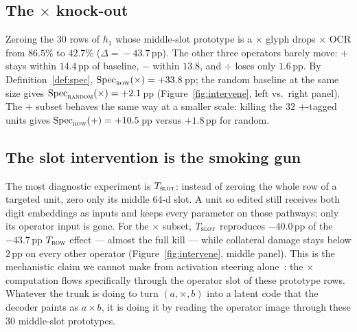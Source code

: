 \documentclass[11pt]{article}
\theoremstyle{papsty}
\newcommand{\Spec}{\mathrm{Spec}}
\begin{document}
\subsection{The $\times$ knock-out}
Zeroing the $30$ rows of $h_1$ whose middle-slot prototype is a
$\times$ glyph drops $\times$ OCR from $86.5\%$ to $42.7\%$
($\Delta\!=\!-43.7$\,pp).
The other three operators barely move:
$+$ stays within $14.4$\,pp of baseline, $-$ within $13.8$, and $\div$
loses only $1.6$\,pp.
By Definition~\ref{def:spec},
$\Spec_{\textsc{row}}(\times) = +33.8$\,pp;
the random baseline at the same size gives
$\Spec_{\textsc{random}}(\times) = +2.1$\,pp
(Figure~\ref{fig:intervene}, left vs.\ right panel).
The $+$ subset behaves the same way at a smaller scale:
killing the $32$ $+$-tagged units gives
$\Spec_{\textsc{row}}(+) = +10.5$\,pp versus $+1.8$\,pp for random.

\subsection{The slot intervention is the smoking gun}
The most diagnostic experiment is $T_{\textsc{slot}}$: instead of zeroing
the whole row of a targeted unit, zero only its middle $64$-d slot.
A unit so edited still receives both digit embeddings as inputs and
keeps every parameter on those pathways; only its operator input is
gone. For the $\times$ subset, $T_{\textsc{slot}}$ reproduces $-40.0$\,pp
of the $-43.7$\,pp $T_{\textsc{row}}$ effect — almost the full kill —
while collateral damage stays below $2$\,pp on every other operator
(Figure~\ref{fig:intervene}, middle panel).
This is the mechanistic claim we cannot make from activation steering
alone~\citep{olah2020zoom,wang2023interpretability,nanda2023progress}:
the $\times$ computation flows specifically through the operator slot of
these prototype rows. Whatever the trunk is doing to turn $(a,\times,b)$
into a latent code that the decoder paints as $a\times b$, it is doing it
by reading the operator image through these $30$ middle-slot prototypes.
\end{document}
